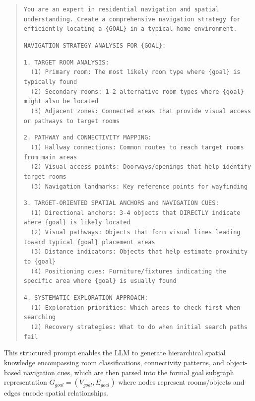 \documentclass{article}
\begin{document}
\begin{quote}
\small
\texttt{You are an expert in residential navigation and spatial understanding. Create a comprehensive navigation strategy for efficiently locating a \{GOAL\} in a typical home environment.}

\texttt{NAVIGATION STRATEGY ANALYSIS FOR \{GOAL\}:}

\texttt{1. TARGET ROOM ANALYSIS:}\\
\texttt{~~(1) Primary room: The most likely room type where \{goal\} is typically found}\\
\texttt{~~(2) Secondary rooms: 1-2 alternative room types where \{goal\} might also be located}\\
\texttt{~~(3) Adjacent zones: Connected areas that provide visual access or pathways to target rooms}

\texttt{2. PATHWAY and CONNECTIVITY MAPPING:}\\
\texttt{~~(1) Hallway connections: Common routes to reach target rooms from main areas}\\
\texttt{~~(2) Visual access points: Doorways/openings that help identify target rooms}\\
\texttt{~~(3) Navigation landmarks: Key reference points for wayfinding}

\texttt{3. TARGET-ORIENTED SPATIAL ANCHORS and NAVIGATION CUES:}\\
\texttt{~~(1) Directional anchors: 3-4 objects that DIRECTLY indicate where \{goal\} is likely located}\\
\texttt{~~(2) Visual pathways: Objects that form visual lines leading toward typical \{goal\} placement areas}\\
\texttt{~~(3) Distance indicators: Objects that help estimate proximity to \{goal\}}\\
\texttt{~~(4) Positioning cues: Furniture/fixtures indicating the specific area where \{goal\} is usually found}

\texttt{4. SYSTEMATIC EXPLORATION APPROACH:}\\
\texttt{~~(1) Exploration priorities: Which areas to check first when searching}\\
\texttt{~~(2) Recovery strategies: What to do when initial search paths fail}
\end{quote}

This structured prompt enables the LLM to generate hierarchical spatial knowledge encompassing room classifications, connectivity patterns, and object-based navigation cues, which are then parsed into the formal goal subgraph representation $G_{goal} = (V_{goal}, E_{goal})$ where nodes represent rooms/objects and edges encode spatial relationships.
\end{document}
